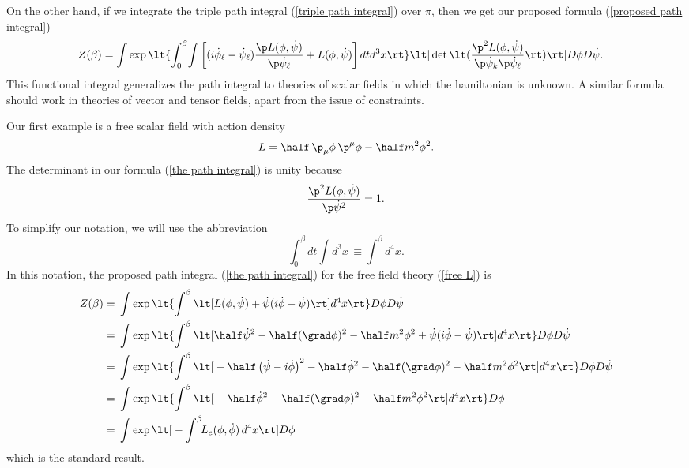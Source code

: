 \documentclass[prd,preprint,floatfix,showpacs]{revtex4-1}
\begin{document}
On the other hand, if we integrate
the triple path integral (\ref {triple path integral})
over \( \pi \), then we get our proposed
formula (\ref {proposed path integral})
\begin{equation}
   \begin{split}
Z(\beta) = {}&
\! \int \exp \lt\{ \int_0^\beta \! \int \left[
( i \dot \phi_\ell - \dot \psi_\ell ) 
\frac{ \p  L(\phi, \dot \psi) }
{ \p \dot \psi_\ell }
+ L(\phi, \dot \psi) \right]
dt d^3x \rt\}
\lt| \det \lt( \frac{ \p^2  L(\phi, \dot \psi) }
{ \p \dot \psi_k \p \dot \psi_\ell }  \rt) \rt|
D\phi D\dot\psi .
\label {the path integral}
   \end{split}
\end{equation}
This functional integral generalizes 
the path integral to theories of scalar fields
in which the hamiltonian is unknown.
A similar formula should work in
theories of vector and tensor fields,
apart from the issue of constraints.
\par
Our first example is a free scalar field
with action density
\begin{equation}
L = \half \, \p_\mu \phi \, \p^\mu \phi 
- \half m^2 \phi^2 .
\label {free L}
\end{equation}
The determinant in our formula
(\ref {the path integral}) is unity because
\begin{equation}
\frac{ \p^2  L(\phi, \dot \psi) }
{ \p \dot \psi^2 } = 1 .
\end{equation}
To simplify our notation,
we will use the abbreviation
\begin{equation}
\int_0^\beta dt \! \int d^3x \, \equiv \int^\beta d^4x.
\label {we will use the compact notation}
\end{equation}
In this notation,
the proposed path integral
(\ref {the path integral}) 
for the free field theory (\ref {free L}) is
\begin{equation}
   \begin{split}
Z(\beta) = {}&
\int \exp \lt\{ \int^\beta \lt[  L(\phi, \dot \psi) 
+ \dot \psi ( i \dot \phi - \dot \psi )
\rt] d^4x \rt\}  D\phi D\dot \psi \\
= {}&
\int \exp \lt\{ \int^\beta \lt[  
\half \dot \psi^2 - \half (\grad \phi)^2 
- \half m^2 \phi^2 
+ \dot \psi ( i \dot \phi - \dot \psi )
\rt] d^4x \rt\}  D\phi D\dot \psi \\
= {}&
\int \exp \lt\{ \int^\beta \lt[ {} 
- \half \left( \dot \psi - i \dot \phi \right)^2
- \half \dot \phi^2 
- \half (\grad \phi)^2 
- \half m^2 \phi^2 
\rt] d^4x \rt\}  D\phi D\dot \psi \\
= {}&
\int \exp \lt\{ \int^\beta \lt[ {} - \half \dot \phi^2
- \half (\grad \phi)^2 
- \half m^2 \phi^2 
\rt] d^4x \rt\}  D\phi \\
= {}&\int \exp \lt[ {} - \int^\beta \!\!
L_e(\phi, \dot \phi) \, d^4x \rt]  D\phi 
\label {free path integral}
   \end{split}
\end{equation}
which is the standard result.
\end{document}
